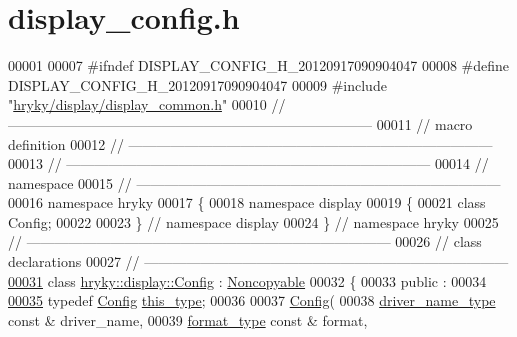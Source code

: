 \hypertarget{display__config_8h_source}{\section{display\-\_\-config.\-h}
}

\begin{DoxyCode}
00001 
00007 \textcolor{preprocessor}{#ifndef DISPLAY\_CONFIG\_H\_20120917090904047}
00008 \textcolor{preprocessor}{}\textcolor{preprocessor}{#define DISPLAY\_CONFIG\_H\_20120917090904047}
00009 \textcolor{preprocessor}{}\textcolor{preprocessor}{#include "\hyperlink{display__common_8h}{hryky/display/display_common.h}"}
00010 \textcolor{comment}{//
      ------------------------------------------------------------------------------}
00011 \textcolor{comment}{// macro definition}
00012 \textcolor{comment}{//
      ------------------------------------------------------------------------------}
00013 \textcolor{comment}{//
      ------------------------------------------------------------------------------}
00014 \textcolor{comment}{// namespace}
00015 \textcolor{comment}{//
      ------------------------------------------------------------------------------}
00016 \textcolor{keyword}{namespace }hryky
00017 \{
00018 \textcolor{keyword}{namespace }display
00019 \{
00021     \textcolor{keyword}{class }Config;
00022 
00023 \} \textcolor{comment}{// namespace display}
00024 \} \textcolor{comment}{// namespace hryky}
00025 \textcolor{comment}{//
      ------------------------------------------------------------------------------}
00026 \textcolor{comment}{// class declarations}
00027 \textcolor{comment}{//
      ------------------------------------------------------------------------------}
\hypertarget{display__config_8h_source_l00031}{}\hyperlink{classhryky_1_1display_1_1_config}{00031} \textcolor{comment}{}\textcolor{keyword}{class }\hyperlink{classhryky_1_1display_1_1_config}{hryky::display::Config} : \hyperlink{classhryky_1_1_noncopyable}{Noncopyable}
00032 \{
00033 \textcolor{keyword}{public} :
00034 
\hypertarget{display__config_8h_source_l00035}{}\hyperlink{classhryky_1_1display_1_1_config_a9aec5d4d622e17f4da8bf74403cbff4a}{00035}     \textcolor{keyword}{typedef} \hyperlink{classhryky_1_1display_1_1_config}{Config} \hyperlink{classhryky_1_1display_1_1_config_a9aec5d4d622e17f4da8bf74403cbff4a}{this_type};
00036 
00037     \hyperlink{classhryky_1_1display_1_1_config}{Config}(
00038         \hyperlink{classhryky_1_1_string}{driver_name_type} \textcolor{keyword}{const} & driver\_name,
00039         \hyperlink{classhryky_1_1pixel_1_1_format}{format_type} \textcolor{keyword}{const} & format,

\end{DoxyCode}
